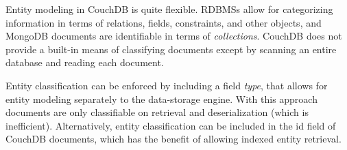 Entity modeling in CouchDB is quite flexible. RDBMSs allow for categorizing information in terms of relations, fields, constraints, and other objects, and MongoDB documents are identifiable in terms of \textit{collections}. CouchDB does not provide a built-in means of classifying documents except by scanning an entire database and reading each document.

Entity classification can be enforced by including a field \textit{type}, that allows for entity modeling separately to the data-storage engine. With this approach documents are only classifiable on retrieval and deserialization (which is inefficient). Alternatively, entity classification can be included in the id field of CouchDB documents, which has the benefit of allowing indexed entity retrieval.
